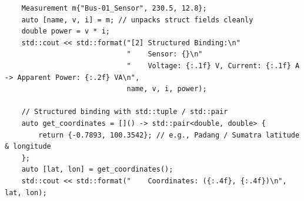 \begin{verbatim}
    Measurement m{"Bus-01_Sensor", 230.5, 12.8};
    auto [name, v, i] = m; // unpacks struct fields cleanly
    double power = v * i;
    std::cout << std::format("[2] Structured Binding:\n"
                             "    Sensor: {}\n"
                             "    Voltage: {:.1f} V, Current: {:.1f} A -> Apparent Power: {:.2f} VA\n",
                             name, v, i, power);

    // Structured binding with std::tuple / std::pair
    auto get_coordinates = []() -> std::pair<double, double> {
        return {-0.7893, 100.3542}; // e.g., Padang / Sumatra latitude & longitude
    };
    auto [lat, lon] = get_coordinates();
    std::cout << std::format("    Coordinates: ({:.4f}, {:.4f})\n", lat, lon);
\end{verbatim}
